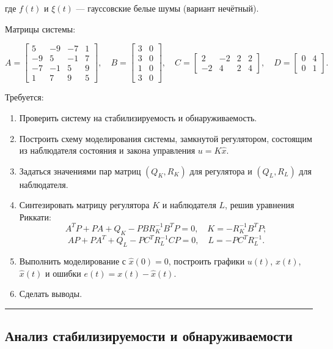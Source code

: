 \documentclass[a4paper,12pt]{article}
\begin{document}
где $f(t)$ и $\xi(t)$ --- гауссовские белые шумы (вариант нечётный).

Матрицы системы:

\[
A = \begin{bmatrix}
	5 & -9 & -7 & 1 \\
	-9 & 5 & -1 & 7 \\
	-7 & -1 & 5 & 9 \\
	1 & 7 & 9 & 5
\end{bmatrix}, \quad
B = \begin{bmatrix}
	3 & 0 \\
	3 & 0 \\
	1 & 0 \\
	3 & 0
\end{bmatrix}, \quad
C = \begin{bmatrix}
	2 & -2 & 2 & 2 \\
	-2 & 4 & 2 & 4
\end{bmatrix}, \quad
D = \begin{bmatrix}
	0 & 4 \\
	0 & 1
\end{bmatrix}.
\]

Требуется:

\begin{enumerate}
	\item Проверить систему на стабилизируемость и обнаруживаемость.
	
	\item Построить схему моделирования системы, замкнутой регулятором, состоящим из наблюдателя состояния и закона управления $u = K\hat{x}$.
	
	\item Задаться значениями пар матриц $(Q_K, R_K)$ для регулятора и $(Q_L, R_L)$ для наблюдателя.
	
	\item Синтезировать матрицу регулятора $K$ и наблюдателя $L$, решив уравнения Риккати:
	\[
	A^T P + P A + Q_K - P B R_K^{-1} B^T P = 0, \quad K = -R_K^{-1} B^T P;
	\]
	\[
	A P + P A^T + Q_L - P C^T R_L^{-1} C P = 0, \quad L = -P C^T R_L^{-1}.
	\]
	
	\item Выполнить моделирование с $\hat{x}(0)=0$, построить графики $u(t)$, $x(t)$, $\hat{x}(t)$ и ошибки $e(t)=x(t)-\hat{x}(t)$.
	
	\item Сделать выводы.
\end{enumerate}
	
\hrule \newpage

\subsection{Анализ стабилизируемости и обнаруживаемости}
	
\end{document}
